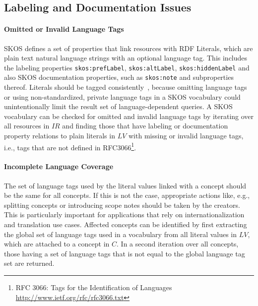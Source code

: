 
\subsection{Labeling and Documentation Issues}

\paragraph{Omitted or Invalid Language Tags}

SKOS defines a set of properties that link resources with RDF Literals, which are plain text natural language strings with an optional language tag. This includes the labeling properties \texttt{skos:prefLabel}, \texttt{skos:altLabel}, \texttt{skos:hiddenLabel} and also SKOS documentation properties, such as \texttt{skos:note} and subproperties thereof. Literals should be tagged consistently~\cite{Vrandecic2010}, because omitting language tags or using non-standardized, private language tags in a SKOS vocabulary could unintentionally limit the result set of language-dependent queries.
A SKOS vocabulary can be checked for omitted and invalid language tags by iterating over all resources in $IR$ and finding those that have labeling or documentation property relations to plain literals in $LV$ with missing or invalid language tags, i.e., tags that are not defined in RFC3066\footnote{RFC 3066: Tags for the Identification of Languages \url{http://www.ietf.org/rfc/rfc3066.txt}}.

\paragraph{Incomplete Language Coverage}

The set of language tags used by the literal values linked with a concept should be the same for all concepts. If this is not the case, appropriate actions like, e.g., splitting concepts or introducing scope notes should be taken by the creators. This is particularly important for applications that rely on internationalization and translation use cases.
Affected concepts can be identified by first extracting the global set of language tags used in a vocabulary from all literal values in $LV$, which are attached to a concept in $C$. In a second iteration over all concepts, those having a set of language tags that is not equal to the global language tag set are returned.

